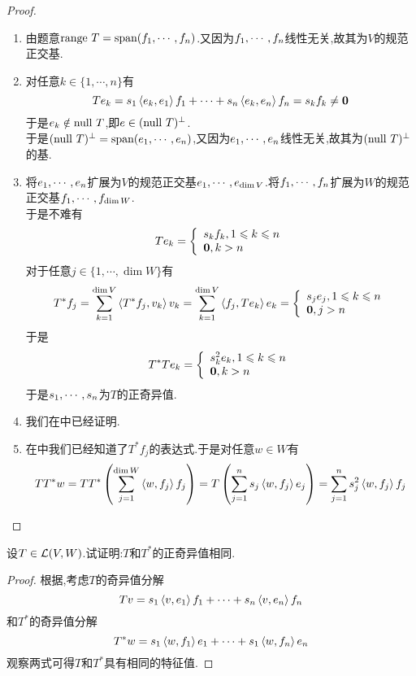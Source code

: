 \documentclass{ctexart}
\begin{document}
\begin{proof}
    \begin{enumerate}[label=\tbf{(\arabic*)}]
        \item 由题意$\text{range } T=\text{span}({f}_1,\cdots,{f}_{n})$.又因为${f}_1,\cdots,{f}_{n}$线性无关,故其为$V$的规范正交基.
        \item 对任意$k\in\{1,\cdots,n\}$有
            \[Te_k=s_1\left\langle{e_k},{e_1}\right\rangle f_1+\cdots+s_n\left\langle{e_k},{e_n}\right\rangle f_n=s_kf_k\neq\mathbf0\]
            于是$e_k\notin\text{null } T$,即$e\in(\text{null } T)^\bot$.\\
            于是$(\text{null } T)^\bot=\text{span}({e}_1,\cdots,{e}_{n})$,又因为${e}_1,\cdots,{e}_{n}$线性无关,故其为$(\text{null } T)^\bot$的基.
        \item 将${e}_1,\cdots,{e}_{n}$扩展为$V$的规范正交基${e}_1,\cdots,{e}_{\dim V}$.将${f}_1,\cdots,{f}_{n}$扩展为$W$的规范正交基${f}_1,\cdots,{f}_{\dim W}$.\\
            于是不难有
            \[Te_k=\left\{\begin{array}{l}
                s_kf_k,1\leqslant k\leqslant n\\
                \mathbf0,k>n
            \end{array}\right.\]
            对于任意$j\in\{1,\cdots,\dim W\}$有
            \[T^*f_j=\sum_{k=1}^{\dim V}\left\langle{T^*f_j},{v_k}\right\rangle v_k=\sum_{k=1}^{\dim V}\left\langle{f_j},{Te_k}\right\rangle e_k=\left\{\begin{array}{l}
                s_je_j,1\leqslant k\leqslant n\\
                \mathbf0,j>n
            \end{array}\right.\]
            于是
            \[T^*Te_k=\left\{\begin{array}{l}
                s_k^2e_k,1\leqslant k\leqslant n\\
                \mathbf0,k>n
            \end{array}\right.\]
            于是${s}_1,\cdots,{s}_{n}$为$T$的正奇异值.
        \item 我们在中已经证明.
        \item 在中我们已经知道了$T^*f_j$的表达式.于是对任意$w\in W$有
            \[TT^*w=TT^*\left(\sum_{j=1}^{\dim W}\left\langle{w},{f_j}\right\rangle f_j\right)=T\left(\sum_{j=1}^{n}s_j\left\langle{w},{f_j}\right\rangle e_j\right)=\sum_{j=1}^{n}s_j^2\left\langle{w},{f_j}\right\rangle f_j\]
    \end{enumerate}
\end{proof}
\begin{problem}[9.]
    设$T\in\mathcal{L}(V,W)$.试证明:$T$和$T^*$的正奇异值相同.
\end{problem}
\begin{proof}
    根据,考虑$T$的奇异值分解
    \[Tv=s_1\left\langle{v},{e_1}\right\rangle f_1+\cdots+s_n\left\langle{v},{e_n}\right\rangle f_n\]
    和$T^*$的奇异值分解
    \[T^*w=s_1\left\langle{w},{f_1}\right\rangle e_1+\cdots+s_1\left\langle{w},{f_n}\right\rangle e_n\]
    观察两式可得$T$和$T^*$具有相同的特征值.
\end{proof}
\end{document}
